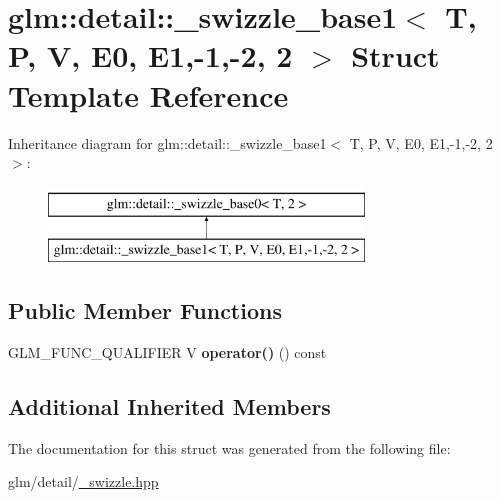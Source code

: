 \hypertarget{structglm_1_1detail_1_1__swizzle__base1_3_01T_00_01P_00_01V_00_01E0_00_01E1_00-1_00-2_00_012_01_4}{\section{glm\-:\-:detail\-:\-:\-\_\-swizzle\-\_\-base1$<$ T, P, V, E0, E1,-\/1,-\/2, 2 $>$ Struct Template Reference}
\label{structglm_1_1detail_1_1__swizzle__base1_3_01T_00_01P_00_01V_00_01E0_00_01E1_00-1_00-2_00_012_01_4}
}
Inheritance diagram for glm\-:\-:detail\-:\-:\-\_\-swizzle\-\_\-base1$<$ T, P, V, E0, E1,-\/1,-\/2, 2 $>$\-:\begin{figure}[H]
\begin{center}
\leavevmode
\includegraphics[height=2.000000cm]{structglm_1_1detail_1_1__swizzle__base1_3_01T_00_01P_00_01V_00_01E0_00_01E1_00-1_00-2_00_012_01_4}
\end{center}
\end{figure}
\subsection*{Public Member Functions}
\begin{DoxyCompactItemize}
\item 
\hypertarget{structglm_1_1detail_1_1__swizzle__base1_3_01T_00_01P_00_01V_00_01E0_00_01E1_00-1_00-2_00_012_01_4_a333b1c869374c290a8bca707a258f5e5}{G\-L\-M\-\_\-\-F\-U\-N\-C\-\_\-\-Q\-U\-A\-L\-I\-F\-I\-E\-R V {\bfseries operator()} () const }\label{structglm_1_1detail_1_1__swizzle__base1_3_01T_00_01P_00_01V_00_01E0_00_01E1_00-1_00-2_00_012_01_4_a333b1c869374c290a8bca707a258f5e5}

\end{DoxyCompactItemize}
\subsection*{Additional Inherited Members}


The documentation for this struct was generated from the following file\-:\begin{DoxyCompactItemize}
\item 
glm/detail/\hyperlink{__swizzle_8hpp}{\-\_\-swizzle.\-hpp}\end{DoxyCompactItemize}
